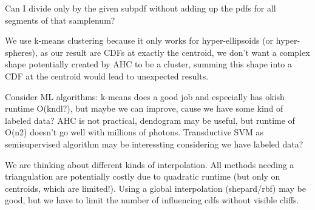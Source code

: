 Can I divide only by the given subpdf without adding up the pdfs for all segments of that samplenum?

We use k-means clustering because it only works for hyper-ellipsoids (or hyper-spheres), as our result are CDFs at exactly the centroid, we don't want a complex shape potentially created by AHC to be a cluster, summing this shape into a CDF at the centroid would lead to unexpected results.

Consider ML algorithms: k-means does a good job and especially has okish runtime O(kndl?), but maybe we can improve, cause we have some kind of labeled data? AHC is not practical, dendogram may be useful, but runtime of O(n2) doesn't go well with millions of photons. Transductive SVM as semisupervised algorithm may be interessting considering we have labeled data? 

We are thinking about different kinds of interpolation. All methods needing a triangulation are potentially costly due to quadratic runtime (but only on centroids, which are limited!). Using a global interpolation (shepard/rbf) may be good, but we have to limit the number of influencing cdfs without visible cliffs.
